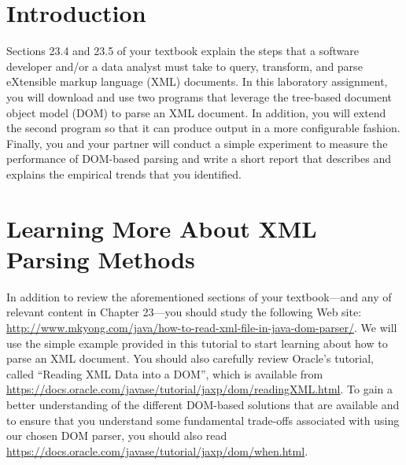 


\usepackage[compact]{titlesec}



\section*{Introduction}

Sections 23.4 and 23.5 of your textbook explain the steps that a software developer and/or a data analyst must take to
query, transform, and parse eXtensible markup language (XML) documents. In this laboratory assignment, you will download
and use two programs that leverage the tree-based document object model (DOM) to parse an XML document.  In addition,
you will extend the second program so that it can produce output in a more configurable fashion.  Finally, you and your
partner will conduct a simple experiment to measure the performance of DOM-based parsing and write a short report that
describes and explains the empirical trends that you identified.

\vspace*{-.05in}
\section*{Learning More About XML Parsing Methods}

In addition to review the aforementioned sections of your textbook---and any of relevant content in Chapter 23---you
should study the following Web site: \url{http://www.mkyong.com/java/how-to-read-xml-file-in-java-dom-parser/}. We will
use the simple example provided in this tutorial to start learning about how to parse an XML document.  You should also
carefully review Oracle's tutorial, called ``Reading XML Data into a DOM'', which is available from
\url{https://docs.oracle.com/javase/tutorial/jaxp/dom/readingXML.html}. To gain a better understanding of the different
DOM-based solutions that are available and to ensure that you understand some fundamental trade-offs associated with
using our chosen DOM parser, you should also read \url{https://docs.oracle.com/javase/tutorial/jaxp/dom/when.html}.

\vspace*{-.05in}
